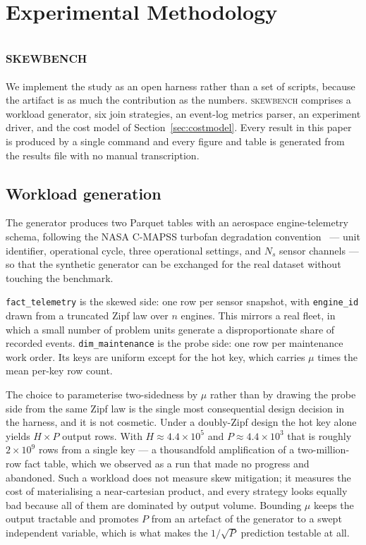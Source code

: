 \section{Experimental Methodology}
\label{sec:methodology}

\subsection{\textsc{skewbench}}

We implement the study as an open harness rather than a set of scripts, because
the artifact is as much the contribution as the numbers. \textsc{skewbench}
comprises a workload generator, six join strategies, an event-log metrics
parser, an experiment driver, and the cost model of
Section~\ref{sec:costmodel}. Every result in this paper is produced by a single
command and every figure and table is generated from the results file with no
manual transcription.

\subsection{Workload generation}

The generator produces two Parquet tables with an aerospace engine-telemetry
schema, following the NASA C-MAPSS turbofan degradation
convention~\cite{saxena2008cmapss} --- unit identifier, operational cycle,
three operational settings, and $N_s$ sensor channels --- so that the synthetic
generator can be exchanged for the real dataset without touching the benchmark.

\texttt{fact\_telemetry} is the skewed side: one row per sensor snapshot, with
\texttt{engine\_id} drawn from a truncated Zipf law over $n$ engines. This
mirrors a real fleet, in which a small number of problem units generate a
disproportionate share of recorded events. \texttt{dim\_maintenance} is the
probe side: one row per maintenance work order. Its keys are uniform except for
the hot key, which carries $\mu$ times the mean per-key row count.

The choice to parameterise two-sidedness by $\mu$ rather than by drawing the
probe side from the same Zipf law is the single most consequential design
decision in the harness, and it is not cosmetic. Under a doubly-Zipf design the
hot key alone yields $H \times P$ output rows. With $H \approx 4.4\times10^{5}$
and $P \approx 4.4\times10^{3}$ that is roughly $2\times10^{9}$ rows from a
single key --- a thousandfold amplification of a two-million-row fact table,
which we observed as a run that made no progress and abandoned. Such a workload
does not measure skew mitigation; it measures the cost of materialising a
near-cartesian product, and every strategy looks equally bad because all of
them are dominated by output volume. Bounding $\mu$ keeps the
output tractable and promotes $P$ from an artefact of the generator to a swept
independent variable, which is what makes the $1/\sqrt{P}$ prediction testable
at all.

